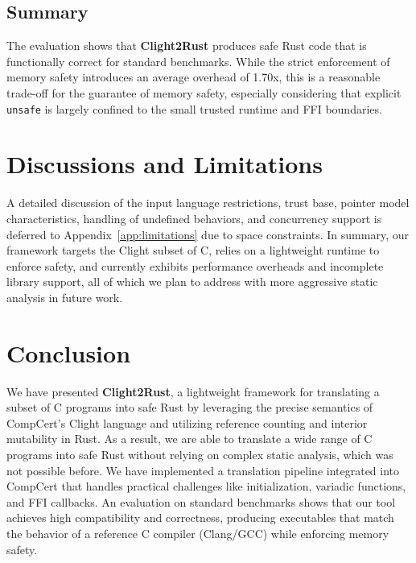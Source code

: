 \documentclass{llncs} %
\begin{document}
\subsection{Summary}
The evaluation shows that \textbf{Clight2Rust} produces safe Rust code that is functionally correct for standard benchmarks. While the strict enforcement of memory safety introduces an average overhead of 1.70x, this is a reasonable trade-off for the guarantee of memory safety, especially considering that explicit \texttt{unsafe} is largely confined to the small trusted runtime and FFI boundaries.

\section{Discussions and Limitations}
\label{sec:discuss}
A detailed discussion of the input language restrictions, trust base, pointer model characteristics, handling of undefined behaviors, and concurrency support is deferred to Appendix~\ref{app:limitations} due to space constraints. In summary, our framework targets the Clight subset of C, relies on a lightweight runtime to enforce safety, and currently exhibits performance overheads and incomplete library support, all of which we plan to address with more aggressive static analysis in future work.

\section{Conclusion}
\label{sec:concl}

We have presented \textbf{Clight2Rust}, a lightweight framework for translating a subset of C programs into safe Rust by leveraging the precise semantics of CompCert's Clight language and utilizing reference counting and interior mutability in Rust.
As a result, we are able to translate a wide range of C programs into safe Rust without relying on complex static analysis, which was not possible before. We have implemented a translation pipeline integrated into CompCert that handles practical challenges like initialization, variadic functions, and FFI callbacks. An evaluation on standard benchmarks shows that our tool achieves high compatibility and correctness, producing executables that match the behavior of a reference C compiler (Clang/GCC) while enforcing memory safety.
\end{document}
